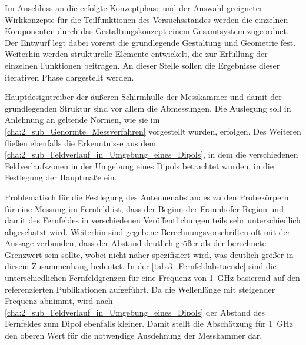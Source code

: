 

Im Anschluss an die erfolgte Konzeptphase und der Auswahl geeigneter Wirkkonzepte für die Teilfunktionen des Versuchsstandes werden die einzelnen Komponenten durch das Gestaltungskonzept einem Gesamtsystem zugeordnet. Der Entwurf legt dabei vorerst die grundlegende Gestaltung und Geometrie fest. Weiterhin werden strukturelle Elemente entwickelt, die zur Erfüllung der einzelnen Funktionen beitragen. An dieser Stelle sollen die Ergebnisse dieser iterativen Phase dargestellt werden.
\par
\vspace{\linespace}
Hauptdesigntreiber der äußeren Schirmhülle der Messkammer und damit der grundlegenden Struktur sind vor allem die Abmessungen. Die Auslegung soll in Anlehnung an geltende Normen, wie sie im \Abschnitt\ref{cha:2_sub_Genormte_Messverfahren} vorgestellt wurden, erfolgen. Des Weiteren fließen ebenfalls die Erkenntnisse aus dem \Abschnitt\ref{cha:2_sub_Feldverlauf_in_Umgebung_eines_Dipols}, in dem die verschiedenen Feldverlaufszonen in der Umgebung eines Dipols betrachtet wurden, in die Festlegung der Hauptmaße ein.
\par
\vspace{\linespace}
Problematisch für die Festlegung des Antennenabstandes zu den Probekörpern für eine Messung im Fernfeld ist, dass der Beginn der Fraunhofer Region und damit des Fernfeldes in verschiedenen Veröffentlichungen teils sehr unterschiedlich abgeschätzt wird. Weiterhin sind gegebene Berechnungsvorschriften oft mit der Aussage verbunden, dass der Abstand deutlich größer als der berechnete Grenzwert sein sollte, wobei nicht näher spezifiziert wird, was deutlich größer in diesem Zusammenhang bedeutet. In der \Tabelle\ref{tab:3_Fernfeldabstaende} sind die unterschiedlichen Fernfeldgrenzen für eine Frequenz von \SI{1}{\giga\hertz} basierend auf den referenzierten Publikationen aufgeführt. Da die Wellenlänge mit steigender Frequenz abnimmt, wird nach \Abschnitt\ref{cha:2_sub_Feldverlauf_in_Umgebung_eines_Dipols} der Abstand des Fernfeldes zum Dipol ebenfalls kleiner. Damit stellt die Abschätzung für \SI{1}{\giga\hertz} den oberen Wert für die notwendige Ausdehnung der Messkammer dar.


